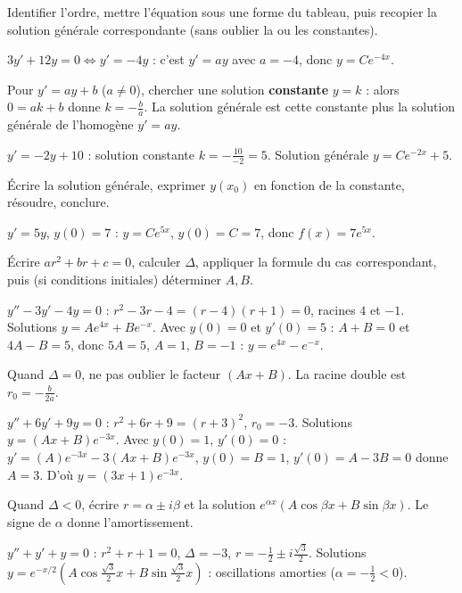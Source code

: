Identifier l'ordre, mettre l'équation sous une forme du tableau, puis recopier la
solution générale correspondante (sans oublier la ou les constantes).
\begin{exemple}
$3y'+12y=0 \Longleftrightarrow y'=-4y$ : c'est $y'=ay$ avec $a=-4$,
donc $y=Ce^{-4x}$.
\end{exemple}

Pour $y'=ay+b$ ($a\neq0$), chercher une solution \textbf{constante} $y=k$ : alors
$0=ak+b$ donne $k=-\frac{b}{a}$. La solution générale est cette constante plus la
solution générale de l'homogène $y'=ay$.
\begin{exemple}
$y'=-2y+10$ : solution constante $k=-\frac{10}{-2}=5$. Solution générale
$y=Ce^{-2x}+5$.
\end{exemple}

Écrire la solution générale, exprimer $y(x_0)$ en fonction de la constante,
résoudre, conclure.
\begin{exemple}
$y'=5y$, $y(0)=7$ : $y=Ce^{5x}$, $y(0)=C=7$, donc $f(x)=7e^{5x}$.
\end{exemple}

Écrire $ar^2+br+c=0$, calculer $\Delta$, appliquer la formule du cas
correspondant, puis (si conditions initiales) déterminer $A,B$.
\begin{exemple}
$y''-3y'-4y=0$ : $r^2-3r-4=(r-4)(r+1)=0$, racines $4$ et $-1$. Solutions
$y=Ae^{4x}+Be^{-x}$. Avec $y(0)=0$ et $y'(0)=5$ : $A+B=0$ et $4A-B=5$, donc
$5A=5$, $A=1$, $B=-1$ : $y=e^{4x}-e^{-x}$.
\end{exemple}

Quand $\Delta=0$, ne pas oublier le facteur $(Ax+B)$. La racine double est
$r_0=-\frac{b}{2a}$.
\begin{exemple}
$y''+6y'+9y=0$ : $r^2+6r+9=(r+3)^2$, $r_0=-3$. Solutions $y=(Ax+B)e^{-3x}$.
Avec $y(0)=1$, $y'(0)=0$ : $y'=(A)e^{-3x}-3(Ax+B)e^{-3x}$, $y(0)=B=1$,
$y'(0)=A-3B=0$ donne $A=3$. D'où $y=(3x+1)e^{-3x}$.
\end{exemple}

Quand $\Delta<0$, écrire $r=\alpha\pm i\beta$ et la solution
$e^{\alpha x}(A\cos\beta x+B\sin\beta x)$. Le signe de $\alpha$ donne
l'amortissement.
\begin{exemple}
$y''+y'+y=0$ : $r^2+r+1=0$, $\Delta=-3$, $r=-\frac12\pm i\frac{\sqrt3}{2}$.
Solutions $y=e^{-x/2}\!\left(A\cos\frac{\sqrt3}{2}x+B\sin\frac{\sqrt3}{2}x\right)$ :
oscillations amorties ($\alpha=-\frac12<0$).
\end{exemple}

